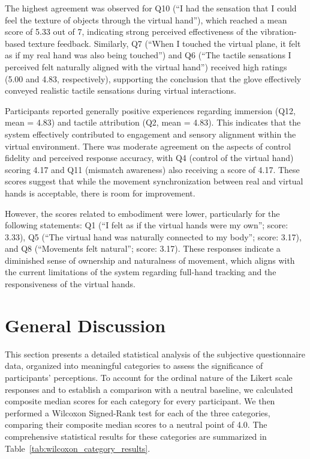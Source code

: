 The highest agreement was observed for Q10 (“I had the sensation that I could feel the texture of objects through the virtual hand”), which reached a mean score of 5.33 out of 7, indicating strong perceived effectiveness of the vibration-based texture feedback. Similarly, Q7 (“When I touched the virtual plane, it felt as if my real hand was also being touched”) and Q6 (“The tactile sensations I perceived felt naturally aligned with the virtual hand”) received high ratings (5.00 and 4.83, respectively), supporting the conclusion that the glove effectively conveyed realistic tactile sensations during virtual interactions.

Participants reported generally positive experiences regarding immersion (Q12, mean = 4.83) and tactile attribution (Q2, mean = 4.83). This indicates that the system effectively contributed to engagement and sensory alignment within the virtual environment. There was moderate agreement on the aspects of control fidelity and perceived response accuracy, with Q4 (control of the virtual hand) scoring 4.17 and Q11 (mismatch awareness) also receiving a score of 4.17. These scores suggest that while the movement synchronization between real and virtual hands is acceptable, there is room for improvement.

However, the scores related to embodiment were lower, particularly for the following statements: Q1 (“I felt as if the virtual hands were my own”; score: 3.33), Q5 (“The virtual hand was naturally connected to my body”; score: 3.17), and Q8 (“Movements felt natural”; score: 3.17). These responses indicate a diminished sense of ownership and naturalness of movement, which aligns with the current limitations of the system regarding full-hand tracking and the responsiveness of the virtual hands.


\section{General Discussion}  

This section presents a detailed statistical analysis of the subjective questionnaire data, organized into meaningful categories to assess the significance of participants' perceptions. To account for the ordinal nature of the Likert scale responses and to establish a comparison with a neutral baseline, we calculated composite median scores for each category for every participant. We then performed a Wilcoxon Signed-Rank test for each of the three categories, comparing their composite median scores to a neutral point of 4.0. The comprehensive statistical results for these categories are summarized in Table~\ref{tab:wilcoxon_category_results}.

